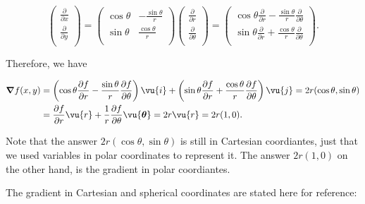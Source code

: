 \documentclass[english,a4paper,12pt]{report}
\begin{document}
{\begin{equation}
	\begin{pmatrix}
		 \frac{\partial }{\partial x}  \\
		 \frac{\partial }{\partial y}  \\
	\end{pmatrix} = \begin{pmatrix}
		\cos \theta  & -\frac{\sin \theta }{r}   \\
		\sin \theta  & \frac{\cos \theta }{r}   \\
	\end{pmatrix} \begin{pmatrix}
		 \frac{\partial }{\partial r}  \\
		 \frac{\partial }{\partial \theta }  \\
	\end{pmatrix} = \begin{pmatrix}
		 \cos \theta \frac{\partial }{\partial r} - \frac{\sin \theta }{r}\frac{\partial }{\partial \theta }   \\
		 \sin \theta \frac{\partial }{\partial r} + \frac{\cos \theta }{r}\frac{\partial }{\partial \theta }   \\
	\end{pmatrix}.
\end{equation}


Therefore, we have 

\begin{equation}
	\begin{aligned} 
	\boldsymbol{\nabla }f(x,y)  &= \left( \cos \theta \frac{\partial f}{\partial r} - \frac{\sin \theta}{r} \frac{\partial f}{\partial \theta }   \right) \vu{i} + \left( \sin \theta \frac{\partial f}{\partial r} + \frac{\cos \theta }{r} \frac{\partial f}{\partial \theta } \right)\vu{j} = 2r(\cos \theta , \sin \theta ) \\ 
	&= \frac{\partial f}{\partial r} \vu{r} + \frac{1}{r} \frac{\partial f}{\partial \theta }\vu{\boldsymbol{\theta } } = 2r \vu{r} = 2r(1,0).  
	\end{aligned}   
\end{equation}

Note that the answer \(2r(\cos \theta ,\sin \theta )\) is still in Cartesian coordiantes, just that we used variables in polar coordinates to represent it. The answer \(2r(1,0)\) on the other hand, is the gradient in polar coordiantes.   



} 


The gradient in Cartesian and spherical coordinates are stated here for reference:
\end{document}
